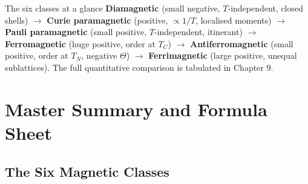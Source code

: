 \documentclass[11pt,a4paper]{article}
\begin{document}
\begin{takeawaybox}{The six classes at a glance}
\textbf{Diamagnetic} (small negative, $T$-independent, closed shells) $\rightarrow$ \textbf{Curie paramagnetic} (positive, $\propto1/T$, localised moments) $\rightarrow$ \textbf{Pauli paramagnetic} (small positive, $T$-independent, itinerant) $\rightarrow$ \textbf{Ferromagnetic} (huge positive, order at $T_C$) $\rightarrow$ \textbf{Antiferromagnetic} (small positive, order at $T_N$, negative $\Theta$) $\rightarrow$ \textbf{Ferrimagnetic} (large positive, unequal sublattices). The full quantitative comparison is tabulated in Chapter 9.
\end{takeawaybox}

\clearpage
\section{Master Summary and Formula Sheet}
\label{ch:summary}

\subsection{The Six Magnetic Classes}
\end{document}
